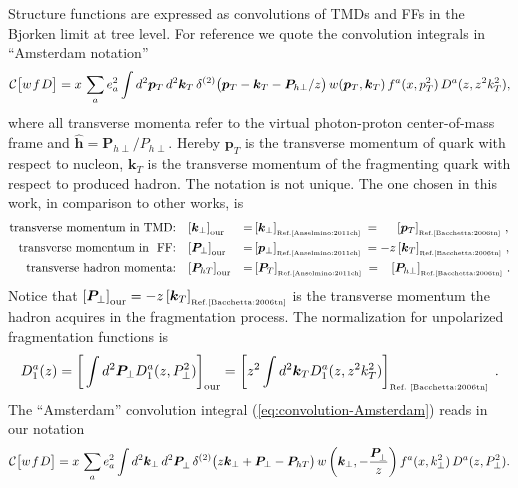 \documentclass[a4paper,11pt]{article}
\newcommand{\be}{\begin{equation}}
\newcommand{\ee}{\end{equation}}
\newcommand{\slim}{\mskip 1.5mu}       %
\def\bfkperp{{\bm k}_\perp}
\def\bfpperp{{\bm P}_\perp}
\def\bfhp{\hat{\bm h}}
\def\bfPhperp{{\bm P}_{hT}}
\def\kperp{k_\perp}
\def\pperp{P_\perp}
\begin{document}
Structure functions are expressed as convolutions of TMDs and FFs 
in the Bjorken limit at tree level. For reference we quote the 
convolution integrals in ``Amsterdam notation'' \cite{Bacchetta:2006tn}
\be
	{\cal C}\bigl[ w\slim f\slim D \bigr]
	=  x \, \sum_a e_a^2 \int d^2 {\bm p}_T \,  d^2 {\bm k}_T
	\, \delta^{(2)}\bigl({\bm p}_T - {\bm k}_T - {\bm P}_{h \perp}/z \bigr)
	\,w({\bm p}_T,{\bm k}_T)\,
	f^a( x ,p_T^2)\,D^a(z,z^2 k_T^2) , \label{eq:convolution-Amsterdam}
\ee
where all transverse momenta refer to the virtual photon-proton 
center-of-mass frame and $\bfhp  ={\bm P}_{h \perp}/{P}_{h\perp}$. 
Hereby ${\bm p}_T$ is 
the transverse momentum of quark with respect to nucleon, 
${\bm k}_T$ is the transverse momentum of the fragmenting quark 
with respect to produced hadron. The notation is not unique. 
The one chosen in this work, in comparison to other works, is 
\begin{alignat}{3} 
	\mbox{transverse momentum in TMD:}\;\;\;&
    	\left[\bfkperp\right]_{\rm our}
    &=& 	\left[{\bm k}_\perp\right]_{\mbox{\tiny Ref.\cite{Anselmino:2011ch}}} \;
    =  	\;\;\;\;\;\left[{\bm p}_T\right]_{\mbox{\tiny Ref.\cite{Bacchetta:2006tn}}}\,,
	\\
	\mbox{transverse momentum in \ FF:}\;\;\;&
	\left[\bfpperp\right]_{\rm our}
    &=& 	\left[{\bm p}_\perp\right]_{\mbox{\tiny Ref.\cite{Anselmino:2011ch}}} \;
    =  	-z\left[{\bm k}_T\right]_{\mbox{\tiny Ref.\cite{Bacchetta:2006tn}}}\,, 
	\\
	\mbox{transverse hadron momenta:}\;\;\;&
    	\left[\bfPhperp\right]_{\rm our}
    &=&	\left[{\bm P}_T\right]_{\mbox{\tiny Ref.\cite{Anselmino:2011ch}}} \;
    =  	\;\;\;\left[{\bm P}_{h\perp}\right]_{\mbox{\tiny Ref.\cite{Bacchetta:2006tn}}}\,.
\end{alignat}
Notice that 
$\left[\bfpperp\right]_{\rm our}=
-z\left[{\bm k}_T\right]_{\mbox{\tiny Ref.\cite{Bacchetta:2006tn}}}$ 
is the transverse momentum the hadron acquires in the fragmentation process.
The normalization for unpolarized fragmentation functions is 
\be
	D_1^a(z) 
	= \left[\,\int d^2{\bm P}_\perp D_1^a(z,P_\perp^2)\right]_{\rm our}
	= \left[z^2\int d^2{\bm k}_TD_1^a(z, z^2  k_T^2)
	  \right]_{\mbox{\tiny Ref.~\cite{Bacchetta:2006tn}}}
	\label{eq:D1}\;. 
\ee
The ``Amsterdam'' convolution integral (\ref{eq:convolution-Amsterdam})
reads in our notation
\be
	{\cal C}\bigl[ w\slim f\slim D \bigr]
	=  x \,
	\sum_a e_a^2 \int d^2 \bfkperp\,  d^2 \bfpperp^{ }
	\, \delta^{(2)}\bigl(z\bfkperp + \bfpperp - \bfPhperp \bigr)
	\,w\left(\bfkperp,-\frac{\bfpperp^{ }}{z}\right)
	f^a( x ,\kperp^2)\,D^a(z,\pperp^2) . \label{eq:convolution_our}
\ee
\end{document}
